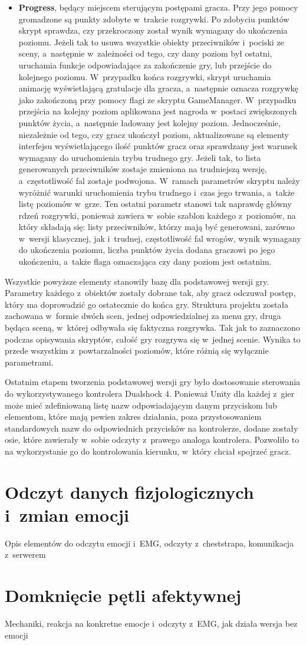 \begin{itemize}
	\item \textbf{Progress}, będący miejscem sterującym postępami gracza. Przy jego pomocy gromadzone są punkty zdobyte w~trakcie rozgrywki. Po zdobyciu punktów skrypt sprawdza, czy przekroczony został wynik wymagany do ukończenia poziomu. Jeżeli tak to usuwa wszystkie obiekty przeciwników i~pociski ze sceny, a~następnie w~zależności od tego, czy dany poziom był ostatni, uruchamia funkcje odpowiadające za zakończenie gry, lub przejście do kolejnego poziomu. W~przypadku końca rozgrywki, skrypt uruchamia animację wyświetlającą gratulacje dla gracza, a~następnie oznacza rozgrywkę jako zakończoną przy pomocy flagi ze skryptu GameManager. W~przypadku przejścia na kolejny poziom aplikowana jest nagroda w~postaci zwiększonych punktów życia, a~następnie ładowany jest kolejny poziom. Jednocześnie, niezależnie od tego, czy gracz ukończył poziom, aktualizowane są elementy interfejsu wyświetlającego ilość punktów gracz oraz sprawdzany jest warunek wymagany do uruchomienia trybu trudnego gry. Jeżeli tak, to lista generowanych przeciwników zostaje zmieniona na trudniejszą wersję, a~częstotliwość fal zostaje podwojona. W~ramach parametrów skryptu należy wyróżnić warunki uruchomienia trybu trudnego i~czas jego trwania, a~także listę poziomów w~grze. Ten ostatni parametr stanowi tak naprawdę główny rdzeń rozgrywki, ponieważ zawiera w~sobie szablon każdego z~poziomów, na który składają się: listy przeciwników, którzy mają być generowani, zarówno w~wersji klasycznej, jak i~trudnej, częstotliwość fal wrogów, wynik wymagany do ukończenia poziomu, liczba punktów życia dodana graczowi po jego ukończeniu, a~także flaga oznaczająca czy dany poziom jest ostatnim.
\end{itemize}

Wszystkie powyższe elementy stanowiły bazę dla podstawowej wersji gry. Parametry każdego z~obiektów zostały dobrane tak, aby gracz odczuwał postęp, który ma doprowadzić go ostatecznie do końca gry. Struktura projektu została zachowana w~formie dwóch scen, jednej odpowiedzialnej za menu gry, druga będąca sceną, w~której odbywała się faktyczna rozgrywka. Tak jak to zaznaczono podczas opisywania skryptów, całość gry rozgrywa się w~jednej scenie. Wynika to przede wszystkim z~powtarzalności poziomów, które różnią się wyłącznie parametrami. 

Ostatnim etapem tworzenia podstawowej wersji gry było dostosowanie sterowania do wykorzystywanego kontrolera Dualshock 4. Ponieważ Unity dla każdej z~gier może mieć zdefiniowaną listę nazw odpowiadającym danym przyciskom lub elementom, które mają pewien zakres działania, poza przystosowaniem standardowych nazw do odpowiednich przycisków na kontrolerze, dodane zostały osie, które zawierały w~sobie odczyty z~prawego analoga kontrolera. Pozwoliło to na wykorzystanie go do kontrolowania kierunku, w~który chciał spojrzeć gracz.

\section{Odczyt danych fizjologicznych i~zmian emocji}
Opis elementów do odczytu emocji i~EMG, odczyty z~cheststrapa, komunikacja z~serwerem

\section{Domknięcie pętli afektywnej}
Mechaniki, reakcja na konkretne emocje i~odczyty z~EMG, jak działa wersja bez emocji